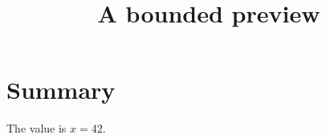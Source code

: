 \documentclass{article}
\title{A bounded preview}
\begin{document}
\maketitle
\section{Summary}
The value is \(x = 42\).
\end{document}
